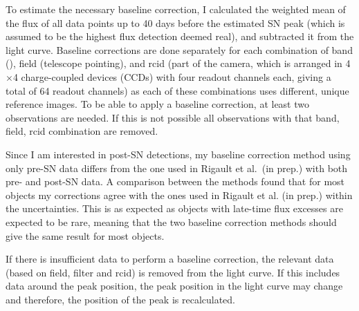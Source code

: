 \documentclass[a4paper,oneside,12pt, class=Latex/Classes/PhDthesisPSnPDF, crop=false]{standalone}
\begin{document}
To estimate the necessary baseline correction, I calculated the weighted mean of the flux of all data points up to 40 days before the estimated SN peak (which is assumed to be the highest flux detection deemed real), and subtracted it from the light curve. Baseline corrections are done separately for each combination of band (\ztfg\ztfr\ztfi), field (telescope pointing), and rcid (part of the camera, which is arranged in 4$\times$4 charge-coupled devices (CCDs) with four readout channels each, giving a total of 64 readout channels) as each of these combinations uses different, unique reference images. To be able to apply a baseline correction, at least two observations are needed. If this is not possible all observations with that band, field, rcid combination are removed.

Since I am interested in post-SN detections, my baseline correction method using only pre-SN data differs from the one used in Rigault et al.~(in prep.) with both pre- and post-SN data. A comparison between the methods found that for most objects my corrections agree with the ones used in Rigault et al. (in prep.) within the uncertainties. This is as expected as objects with late-time flux excesses are expected to be rare, meaning that the two baseline correction methods should give the same result for most objects. 

If there is insufficient data to perform a baseline correction, the relevant data (based on field, filter and rcid) is removed from the light curve. If this includes data around the peak position, the peak position in the light curve may change and therefore, the position of the peak is recalculated. 
\end{document}
